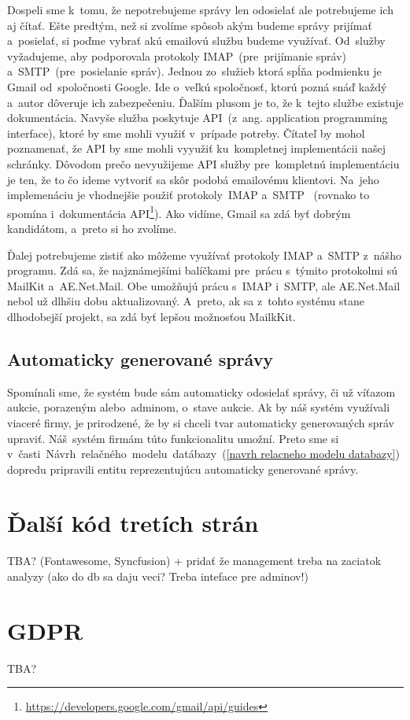 Dospeli sme k~tomu, že nepotrebujeme správy len odosielať ale potrebujeme ich aj čítať. Ešte predtým, než si zvolíme spôsob akým budeme správy prijímať a~posielať, si poďme vybrať akú emailovú službu budeme využívať. Od~služby vyžadujeme, aby podporovala protokoly IMAP~(pre~prijímanie správ) a~SMTP~(pre~posielanie správ). Jednou zo~služieb ktorá spĺňa podmienku je Gmail od~spoločnosti Google. Ide o~veľkú spoločnosť, ktorú pozná snáď každý a~autor dôveruje ich zabezpečeniu. Ďalším plusom je to, že k~tejto službe existuje dokumentácia. Navyše služba poskytuje API~(z~ang. application programming interface), ktoré by sme mohli využiť v~prípade potreby. Čítateľ by mohol poznamenať, že API by sme mohli vyyužiť ku~kompletnej implementácii našej schránky. Dôvodom prečo nevyužijeme API služby pre~kompletnú implementáciu je ten, že to čo ideme vytvoriť sa skôr podobá emailovému klientovi. Na~jeho implemenáciu je vhodnejšie použiť protokoly~IMAP a~SMTP ~(rovnako to spomína i~dokumentácia API\footnote{\url{https://developers.google.com/gmail/api/guides}}). Ako vidíme, Gmail sa zdá byť dobrým kandidátom, a~preto si ho zvolíme.

Ďalej potrebujeme zistiť ako môžeme využívať protokoly IMAP a~SMTP z~nášho programu. Zdá sa, že najznámejšími balíčkami pre~prácu s~týmito protokolmi sú MailKit a~AE.Net.Mail. Obe umožňujú prácu s~IMAP i~SMTP, ale AE.Net.Mail nebol už dlhšiu dobu aktualizovaný. A~preto, ak sa z~tohto systému stane dlhodobejší projekt, sa zdá byť lepšou možnosťou MailkKit.

\subsection{Automaticky generované správy}

Spomínali sme, že systém bude sám automaticky odosielať správy, či už víťazom aukcie, porazeným alebo~adminom, o~stave aukcie. Ak by náš systém využívali viaceré firmy, je prirodzené, že by si chceli tvar automaticky generovaných správ upraviť. Náš~systém firmám túto funkcionalitu umožní. Preto sme si v~časti~Návrh~relačného~modelu~datábazy~(\ref{navrh relacneho modelu databazy}) dopredu pripravili entitu reprezentujúcu automaticky generované správy.

\section{Ďalší kód tretích strán}
TBA? (Fontawesome, Syncfusion) + pridať že management treba na zaciatok analyzy (ako do db sa daju veci? Treba inteface pre adminov!)

\section{GDPR}
TBA?
